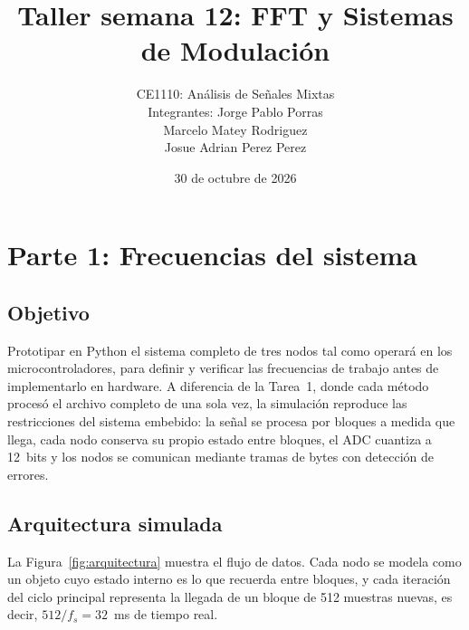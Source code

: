 \documentclass[11pt,a4paper]{article}
\title{Taller semana 12: FFT y Sistemas de Modulación}
\author{CE1110: Análisis de Señales Mixtas \\ Integrantes: Jorge Pablo Porras \\ Marcelo Matey Rodriguez
\\ Josue Adrian Perez Perez}
\date{30 de octubre de 2026}
\begin{document}
\maketitle

\section{Parte 1: Frecuencias del sistema}
\subsection{Objetivo}
Prototipar en Python el sistema completo de tres nodos tal como operará en
los microcontroladores, para definir y verificar las frecuencias de trabajo
antes de implementarlo en hardware. A diferencia de la Tarea~1, donde cada
método procesó el archivo completo de una sola vez, la simulación reproduce
las restricciones del sistema embebido: la señal se procesa por bloques a
medida que llega, cada nodo conserva su propio estado entre bloques, el ADC
cuantiza a 12~bits y los nodos se comunican mediante tramas de bytes con
detección de errores.
 
\subsection{Arquitectura simulada}
La Figura~\ref{fig:arquitectura} muestra el flujo de datos. Cada nodo se
modela como un objeto cuyo estado interno es lo que recuerda entre bloques,
y cada iteración del ciclo principal representa la llegada de un bloque de
512 muestras nuevas, es decir, $512/f_s = 32$~ms de tiempo real.
 
\end{document}
